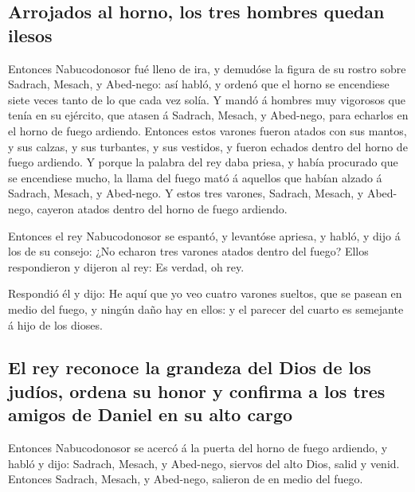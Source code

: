 \hypertarget{arrojados-al-horno-los-tres-hombres-quedan-ilesos}{%
\subsection{Arrojados al horno, los tres hombres quedan
ilesos}\label{arrojados-al-horno-los-tres-hombres-quedan-ilesos}}

 Entonces Nabucodonosor fué lleno de ira, y demudóse la
figura de su rostro sobre Sadrach, Mesach, y Abed-nego: así habló, y
ordenó que el horno se encendiese siete veces tanto de lo que cada vez
solía.  Y mandó á hombres muy vigorosos que tenía en su
ejército, que atasen á Sadrach, Mesach, y Abed-nego, para echarlos en el
horno de fuego ardiendo.  Entonces estos varones fueron
atados con sus mantos, y sus calzas, y sus turbantes, y sus vestidos, y
fueron echados dentro del horno de fuego ardiendo.  Y
porque la palabra del rey daba priesa, y había procurado que se
encendiese mucho, la llama del fuego mató á aquellos que habían alzado á
Sadrach, Mesach, y Abed-nego.  Y estos tres varones,
Sadrach, Mesach, y Abed-nego, cayeron atados dentro del horno de fuego
ardiendo.

 Entonces el rey Nabucodonosor se espantó, y levantóse
apriesa, y habló, y dijo á los de su consejo: ¿No echaron tres varones
atados dentro del fuego? Ellos respondieron y dijeron al rey: Es verdad,
oh rey.

 Respondió él y dijo: He aquí que yo veo cuatro varones
sueltos, que se pasean en medio del fuego, y ningún daño hay en ellos: y
el parecer del cuarto es semejante á hijo de los dioses.

\hypertarget{el-rey-reconoce-la-grandeza-del-dios-de-los-juduxedos-ordena-su-honor-y-confirma-a-los-tres-amigos-de-daniel-en-su-alto-cargo}{%
\subsection{El rey reconoce la grandeza del Dios de los judíos, ordena
su honor y confirma a los tres amigos de Daniel en su alto
cargo}\label{el-rey-reconoce-la-grandeza-del-dios-de-los-juduxedos-ordena-su-honor-y-confirma-a-los-tres-amigos-de-daniel-en-su-alto-cargo}}

 Entonces Nabucodonosor se acercó á la puerta del horno
de fuego ardiendo, y habló y dijo: Sadrach, Mesach, y Abed-nego, siervos
del alto Dios, salid y venid. Entonces Sadrach, Mesach, y Abed-nego,
salieron de en medio del fuego.


